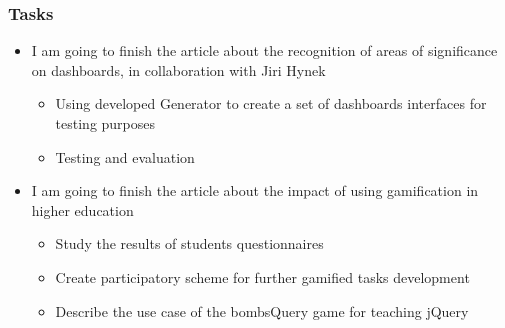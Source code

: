 \documentclass[10pt,xcolor=pdflatex]{beamer}
\begin{document}
\begin{frame}\frametitle{Tasks}

       \begin{itemize}
           \item I am going to finish the article about the recognition of areas of significance on dashboards, in collaboration with Jiri Hynek
               \begin{itemize}
                   \item Using developed Generator to create a set of dashboards interfaces for testing purposes
                   \item Testing and evaluation
               \end{itemize}
           \item I am going to finish the article about the impact of using gamification in higher education
               \begin{itemize}
                  \item Study the results of students questionnaires
                  \item Create participatory scheme for further gamified tasks development
                  \item Describe the use case of the bombsQuery game for teaching jQuery
               \end{itemize} 
       \end{itemize}
\end{frame}


\end{document}
